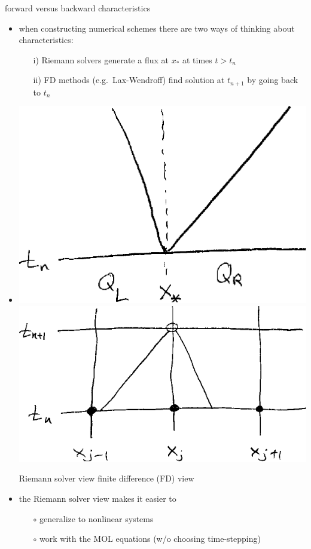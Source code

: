 \documentclass[10pt,hyperref,dvipsnames]{beamer}
\begin{document}
\begin{frame}{forward versus backward characteristics}

\begin{itemize}
\item when constructing numerical schemes there are two ways of thinking about characteristics:
    \begin{itemize}
    \item[i)] Riemann solvers generate a flux at $x_*$ at times $t>t_n$
    \item[ii)] FD methods (e.g.~Lax-Wendroff) find solution at $t_{n+1}$ by going back to $t_n$
    \end{itemize}
\item 

\medskip

\includegraphics[height=0.34\textheight]{figs/rscharssketch} \hfill \includegraphics[height=0.38\textheight]{figs/fdcharssketch}

\medskip
\qquad Riemann solver view \hfill finite difference (FD) view \qquad \phantom{x}

\item the Riemann solver view makes it easier to
    \begin{itemize}
    \item[$\circ$] generalize to nonlinear systems
    \item[$\circ$] work with the MOL equations (w/o choosing time-stepping)
    \end{itemize}
\end{itemize}
\end{frame}
\end{document}
